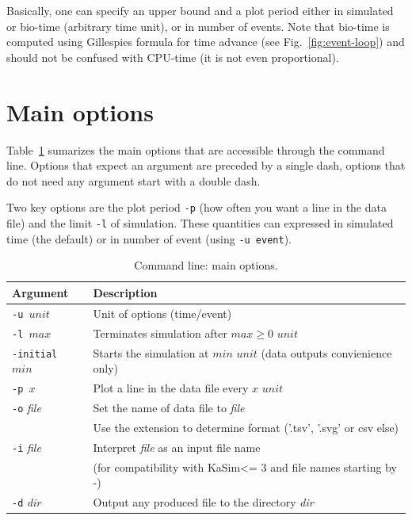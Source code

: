 \documentclass[11pt]{book}
\def\KaSim{\textsf{KaSim}}
\def\ttt#1{\texttt{#1}}
\begin{document}
Basically, one can specify an upper bound and a plot period either in
simulated or bio-time (arbitrary time unit), or in number of events.
Note that bio-time is computed using
Gillespie{\textquotesingle}s formula for time advance (see
Fig.~\ref{fig:event-loop}) and should not be confused with CPU-time
(it is not even proportional).

\section{Main options}

Table~\ref{tab:options} sumarizes the main options that are
accessible through the command line. Options that expect an argument
are preceded by a single dash, options that do not need any argument
start with a double dash.

Two key options are the plot period \ttt{-p} (how often you want a
line in the data file) and the limit \ttt{-l} of simulation. These
quantities can expressed in simulated time (the default) or in number
of event (using \ttt{-u event}).

\begin{table}[h!]
\caption{Command line: main options.}
\centering
\begin{tabular}{|l|l|}
\hline
Argument & Description \\ \hline
\ttt{-u $unit$} & Unit of options (time/event)\\
\ttt{-l $max$} & Terminates simulation after $max \geq 0$ $unit$\\
\ttt{-initial $min$} & Starts the simulation at $min$ $unit$ (data outputs convienience only)\\
\ttt{-p $x$} & Plot a line in the data file every $x$ $unit$\\
\ttt{-o} \textit{file} & Set the name of data file to \textit{file}\\
&Use the extension to determine format ('.tsv', '.svg' or csv else)\\
\ttt{-i} \textit{file} & Interpret \textit{file} as an input file name\\
& (for compatibility with \KaSim <= 3 and file names starting by -)\\
\ttt{-d} \textit{dir} & Output any produced file to the directory \textit{dir}\\
\hline
\end{tabular}
\label{tab:options}
\end{table}%
\end{document}
